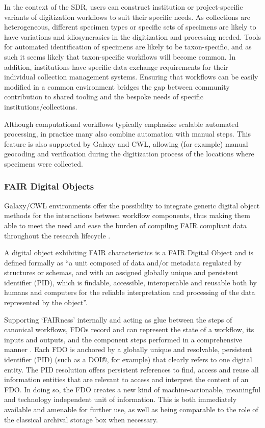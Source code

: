 In the context of the SDR, users can construct institution or
project-specific variants of digitization workflows to suit their
specific needs. As collections are heterogeneous, different specimen
types or specific sets of specimens are likely to have variations and
idiosyncrasies in the digitization and processing needed. Tools for
automated identification of specimens are likely to be taxon-specific,
and as such it seems likely that taxon-specific workflows will become
common. In addition, institutions have specific data exchange
requirements for their individual collection management systems.
Ensuring that workflows can be easily modified in a common environment
bridges the gap between community contribution to shared tooling and the
bespoke needs of specific institutions/collections.

Although computational workflows typically emphasize scalable automated
processing, in practice many also combine automation with manual steps.
This feature is also supported by Galaxy and CWL, allowing (for example)
manual geocoding and verification during the digitization process of the
locations where specimens were collected.

\subsubsection{FAIR Digital Objects}\label{fair-digital-objects-1}

Galaxy/CWL environments offer the possibility to integrate generic
digital object methods \cite{ch8-44,ch8-45,ch8-46} for the interactions between
workflow components, thus making them able to meet the need and ease the
burden of compiling FAIR compliant data throughout the research
lifecycle \cite{ch8-27}.

A digital object exhibiting FAIR characteristics is a FAIR Digital
Object \cite{De Smedt 2020} and is defined formally as ``a unit composed of data
and/or metadata regulated by structures or schemas, and with an assigned
globally unique and persistent identifier (PID), which is findable,
accessible, interoperable and reusable both by humans and computers for
the reliable interpretation and processing of the data represented by
the object''.

Supporting `FAIRness' internally and acting as glue between the steps of
canonical workflows, FDOs record and can represent the state of a
workflow, its inputs and outputs, and the component steps performed in a
comprehensive manner \cite{ch8-27}. Each FDO is anchored by a globally unique
and resolvable, persistent identifier (PID) (such as a DOI®, for
example) that clearly refers to one digital entity. The PID resolution
offers persistent references to find, access and reuse all information
entities that are relevant to access and interpret the content of an
FDO. In doing so, the FDO creates a new kind of machine-actionable,
meaningful and technology independent unit of information. This is both
immediately available and amenable for further use, as well as being
comparable to the role of the classical archival storage box when
necessary.

